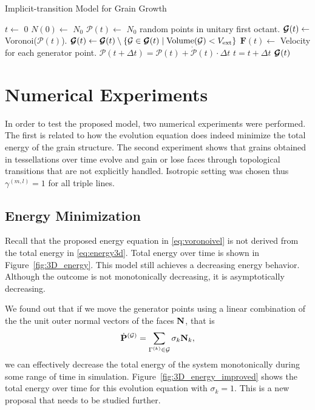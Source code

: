 \begin{algorithm}[t]
\caption{Implicit-transition Model for Grain Growth}
\label{alg:implicit}
\begin{algorithmic}[1]
\State $t \gets$ $0$
\State $N(0) \gets$ $N_0$
\State $\mathcal{P}(t) \gets$ $N_0$ random points in unitary first octant.
\State $\bm{\mathcal{G}}(t) \gets$ Voronoi($\mathcal{P}(t)$).
\State $\bm{\mathcal{G}}(t) \gets \bm{\mathcal{G}}(t) \setminus \{\mathcal{G} \in \bm{\mathcal{G}}(t) \mid \mbox{Volume}(\mathcal{G}) < V_{\text{ext}}\}$
\State $\mathbf{F}(t) \gets$  Velocity for each generator point.
\State $\mathcal{P}(t+\Delta t) = \mathcal{P}(t) + \dot{\mathcal{P}}(t) \cdot \Delta t$
\State $t=t+\Delta t$
\EndWhile
\State \Return $\bm{\mathcal{G}}(t)$
\EndProcedure
\end{algorithmic}
\end{algorithm}

\section{Numerical Experiments}

In order to test the proposed model, two numerical experiments were performed. 
The first is related to how the evolution equation does indeed minimize the total energy of the grain structure. 
The second experiment shows that grains obtained in tessellations over time evolve and gain or lose faces through topological transitions that are not explicitly handled. 
Isotropic setting was chosen thus $\gamma^{(m,l)} = 1$ for all triple lines.

\subsection{Energy Minimization}

Recall that the proposed energy equation in \eqref{eq:voronoivel} is not derived from the total energy in \eqref{eq:energy3d}.
Total energy over time is shown in Figure~\ref{fig:3D_energy}. 
This model still achieves a decreasing energy behavior. 
Although the outcome is not monotonically decreasing, it is asymptotically decreasing.

We found out that if we move the generator points using a linear combination of the the unit outer normal vectors of the faces $\mathbf{N}$, that is
%
\begin{equation}
    \dot{\mathbf{P}}^{(\mathcal{G})} = \sum_{\Gamma^{(k)} \in \mathcal{G}} \sigma_k \mathbf{N}_k,
    \label{eq:voronoivel2}
 \end{equation}
%
we can effectively decrease the total energy of the system monotonically during some range of time in simulation. Figure~\ref{fig:3D_energy_improved} shows the total energy over time for this evolution equation with $\sigma_k = 1$. This is a new proposal that needs to be studied further.

